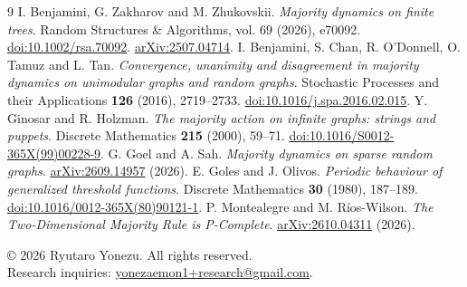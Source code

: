 \documentclass[11pt,a4paper]{article}
\begin{document}
\begin{thebibliography}{9}
 I. Benjamini, G. Zakharov and M. Zhukovskii. \emph{Majority dynamics on finite trees}. Random Structures \& Algorithms, vol. 69 (2026), e70092. \href{https://doi.org/10.1002/rsa.70092}{doi:10.1002/rsa.70092}. \href{https://arxiv.org/abs/2507.04714}{arXiv:2507.04714}.
 I. Benjamini, S. Chan, R. O'Donnell, O. Tamuz and L. Tan. \emph{Convergence, unanimity and disagreement in majority dynamics on unimodular graphs and random graphs}. Stochastic Processes and their Applications \textbf{126} (2016), 2719--2733. \href{https://doi.org/10.1016/j.spa.2016.02.015}{doi:10.1016/j.spa.2016.02.015}.
 Y. Ginosar and R. Holzman. \emph{The majority action on infinite graphs: strings and puppets}. Discrete Mathematics \textbf{215} (2000), 59--71. \href{https://doi.org/10.1016/S0012-365X(99)00228-9}{doi:10.1016/S0012-365X(99)00228-9}.
 G. Goel and A. Sah. \emph{Majority dynamics on sparse random graphs}. \href{https://arxiv.org/abs/2609.14957}{arXiv:2609.14957} (2026).
 E. Goles and J. Olivos. \emph{Periodic behaviour of generalized threshold functions}. Discrete Mathematics \textbf{30} (1980), 187--189. \href{https://doi.org/10.1016/0012-365X(80)90121-1}{doi:10.1016/0012-365X(80)90121-1}.
 P. Montealegre and M. R\'ios-Wilson. \emph{The Two-Dimensional Majority Rule is P-Complete}. \href{https://arxiv.org/abs/2610.04311}{arXiv:2610.04311} (2026).
\end{thebibliography}
\vfill
{\footnotesize \copyright{} 2026 Ryutaro Yonezu. All rights reserved.\\Research inquiries: \href{mailto:yonezaemon1+research@gmail.com}{yonezaemon1+research@gmail.com}.}
\end{document}
